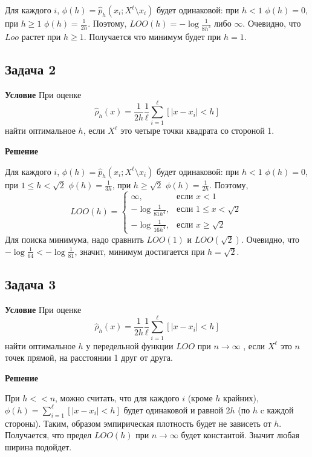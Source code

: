 Для каждого $i$, $\phi(h) = \hat{p}_h(x_i; X^\ell \setminus x_i)$ будет одинаковой: при $h < 1$ $\phi(h) = 0$, при $h \geq 1$ $\phi(h) = \frac{1}{2h}$. Поэтому, $LOO(h) = -\log{\frac{1}{8h^3}}$ либо $\infty$. Очевидно, что $Loo$ растет при $h \geq 1$. Получается что минимум будет при $h = 1$.

\subsection*{Задача 2}
\textbf{Условие}
При оценке
\[
    \hat{\rho}_h(x) = \frac{1}{2h} \frac{1}{\ell} \sum_{i=1}^{\ell} \left[ |x - x_i| < h \right]
\]
найти оптимальное $h$, если $X^\ell$ это четыре точки квадрата со стороной 1.

\textbf{Решение}

Для каждого $i$, $\phi(h) = \hat{p}_h(x_i; X^\ell \setminus x_i)$ будет одинаковой: при $h < 1$ $\phi(h) = 0$, при $1 \leq h < \sqrt{2}$ $\phi(h) = \frac{1}{3h}$, при $h \geq \sqrt{2}$ $\phi(h) = \frac{1}{2h}$. Поэтому,
\[
    LOO(h) =
    \begin{cases}
        \infty,                 & \text{если } x < 1               \\
        -\log{\frac{1}{81h^4}}, & \text{если } 1 \leq x < \sqrt{2} \\
        -\log{\frac{1}{16h^4}}, & \text{если } x \geq \sqrt{2}
    \end{cases}
\]
Для поиска минимума, надо сравнить $LOO(1)$ и $LOO(\sqrt{2})$. Очевидно, что $-\log{\frac{1}{64}} < -\log{\frac{1}{81}}$, значит, минимум достигается при $h = \sqrt{2}$.

\subsection*{Задача 3}
\textbf{Условие}
При оценке
\[
    \hat{\rho}_h(x) = \frac{1}{2h} \frac{1}{\ell} \sum_{i=1}^{\ell} \left[ |x - x_i| < h \right]
\]
найти оптимальное $h$ у передельной функции $LOO$ при $n \to \infty$ , если $X^\ell$ это $n$ точек прямой, на расстоянии 1 друг от друга.

\textbf{Решение}

При $h << n$, можно считать, что для каждого $i$ (кроме $h$ крайних), $\phi(h) = \sum_{i=1}^{\ell} \left[ |x - x_i| < h \right]$ будет одинаковой и равной $2h$ (по $h$ c каждой стороны). Таким, образом эмпирическая плотность будет не зависеть от $h$. Получается, что предел $LOO(h)$ при $n \to \infty$ будет константой. Значит любая ширина подойдет.
